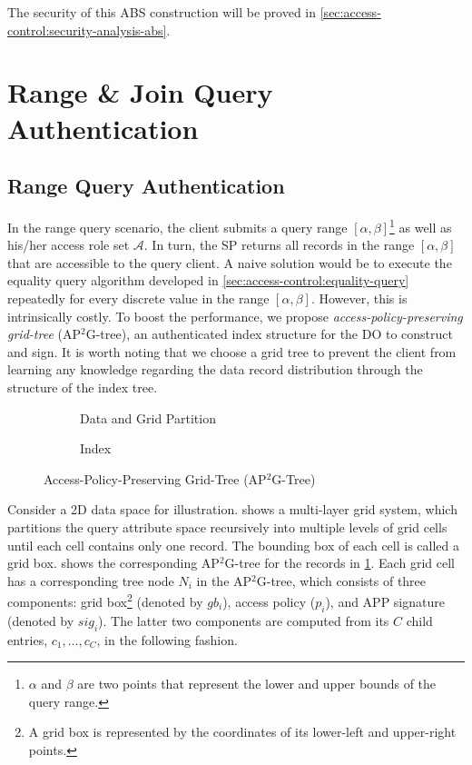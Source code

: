 The security of this ABS construction will be proved in \cref{sec:access-control:security-analysis-abs}.

\section{Range \& Join Query Authentication}\label{sec:access-control:range-query}

\subsection{Range Query Authentication}
In the range query scenario, the client submits a query range $[\alpha, \beta]$\footnote{$\alpha$ and $\beta$ are two points that represent the lower and upper bounds of the query range.} as well as his/her access role set $\mathcal{A}$. In turn, the SP returns all records in the range $[\alpha, \beta]$ that are accessible to the query client. A naive solution would be to execute the equality query algorithm developed in \cref{sec:access-control:equality-query} repeatedly for every discrete value in the range $[\alpha, \beta]$. However, this is intrinsically costly. To boost the performance, we propose \emph{access-policy-preserving grid-tree} (AP$^2$G-tree), an authenticated index structure for the DO to construct and sign.
It is worth noting that we choose a grid tree to prevent the client from learning any knowledge regarding the data record distribution through the structure of the index tree.

\begin{figure}[t]
  \centering
  \begin{subfigure}[b]{\linewidth}
    \centering
    \resizebox{.7\linewidth}{!}{}
    \caption{Data and Grid Partition}\label{fig:access-control:access-tree-struct}
  \end{subfigure}
  \begin{subfigure}[b]{\linewidth}
    \centering
    \resizebox{.7\linewidth}{!}{}
    \caption{Index}\label{fig:access-control:access-tree-index}
  \end{subfigure}
  \caption{Access-Policy-Preserving Grid-Tree (AP$^2$G-Tree)}\label{fig:access-control:access-tree}
\end{figure}

Consider a 2D data space for illustration.  shows a multi-layer grid system, which partitions the query attribute space recursively into multiple levels of grid cells until each cell contains only one record. The bounding box of each cell is called a grid box.  shows the corresponding AP$^2$G-tree for the records in \cref{fig:access-control:access-tree-struct}. Each grid cell has a corresponding tree node $N_i$ in the AP$^2$G-tree, which consists of three components: grid box\footnote{A grid box is represented by the coordinates of its lower-left and upper-right points.} (denoted by $gb_i$), access policy ($p_i$), and APP signature (denoted by $sig_i$). The latter two components are computed from its $C$ child entries, $c_1, \dots, c_C$, in the following fashion.

